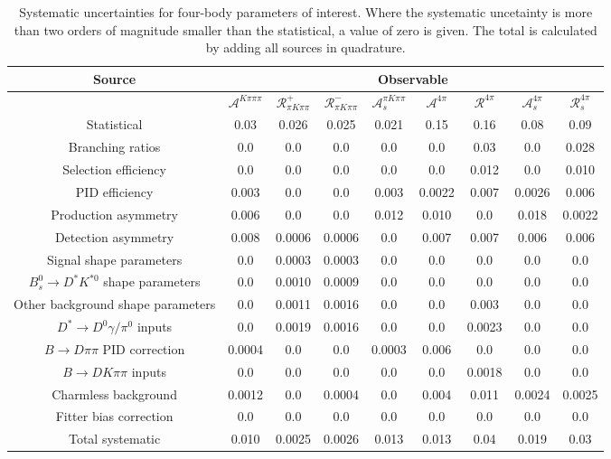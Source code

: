 \begin{sidewaystable}
  \centering
  \begin{tabular}{ccccccccc}
      \toprule
      Source & \multicolumn{8}{c}{Observable} \\
      \midrule
       & $\mathcal{A}^{K\pi\pi\pi}$ & $\mathcal{R}_{\pi K\pi\pi}^+$ & $\mathcal{R}_{\pi K\pi\pi}^-$ & $\mathcal{A}_s^{\pi K\pi\pi}$ & $\mathcal{A}^{4\pi}$ & $\mathcal{R}^{4\pi}$ & $\mathcal{A}_s^{4\pi}$ & $\mathcal{R}_{s}^{4\pi}$ \\
      \midrule
      Statistical & 0.03 & 0.026 & 0.025 & 0.021 & 0.15 & 0.16 & 0.08 & 0.09 \\
      \midrule
      Branching ratios & 0.0  & 0.0  & 0.0  & 0.0  & 0.0  & 0.03 & 0.0  & 0.028 \\
      Selection efficiency & 0.0  & 0.0  & 0.0  & 0.0  & 0.0  & 0.012 & 0.0  & 0.010 \\
      PID efficiency & 0.003 & 0.0  & 0.0  & 0.003 & 0.0022 & 0.007 & 0.0026 & 0.006 \\
      Production asymmetry & 0.006 & 0.0  & 0.0  & 0.012 & 0.010 & 0.0  & 0.018 & 0.0022 \\
      Detection asymmetry & 0.008 & 0.0006 & 0.0006 & 0.0  & 0.007 & 0.007 & 0.006 & 0.006 \\
      Signal shape parameters & 0.0  & 0.0003 & 0.0003 & 0.0  & 0.0  & 0.0  & 0.0  & 0.0  \\
      $B^0_s \to D^* K^{*0}$ shape parameters & 0.0  & 0.0010 & 0.0009 & 0.0  & 0.0  & 0.0  & 0.0  & 0.0  \\
      Other background shape parameters & 0.0  & 0.0011 & 0.0016 & 0.0  & 0.0  & 0.003 & 0.0  & 0.0  \\
      $D^* \to D^0 \gamma/\pi^0$ inputs & 0.0  & 0.0019 & 0.0016 & 0.0  & 0.0  & 0.0023 & 0.0  & 0.0  \\
      $B\to D\pi\pi$ PID correction & 0.0004 & 0.0  & 0.0  & 0.0003 & 0.006 & 0.0  & 0.0  & 0.0  \\
      $B\to DK\pi\pi$ inputs & 0.0  & 0.0  & 0.0  & 0.0  & 0.0  & 0.0018 & 0.0  & 0.0  \\
      Charmless background & 0.0012 & 0.0  & 0.0004 & 0.0  & 0.004 & 0.011 & 0.0024 & 0.0025 \\
      Fitter bias correction & 0.0  & 0.0  & 0.0  & 0.0  & 0.0  & 0.0  & 0.0  & 0.0  \\
      \midrule
      Total systematic & 0.010 & 0.0025 & 0.0026 & 0.013 & 0.013 & 0.04 & 0.019 & 0.03 \\
      \bottomrule
  \end{tabular}
  \caption{Systematic uncertainties for four-body parameters of interest. Where the systematic uncetainty is more than two orders of magnitude smaller than the statistical, a value of zero is given. The total is calculated by adding all sources in quadrature.}
\label{tab:fourBody_systematics}
\end{sidewaystable}
